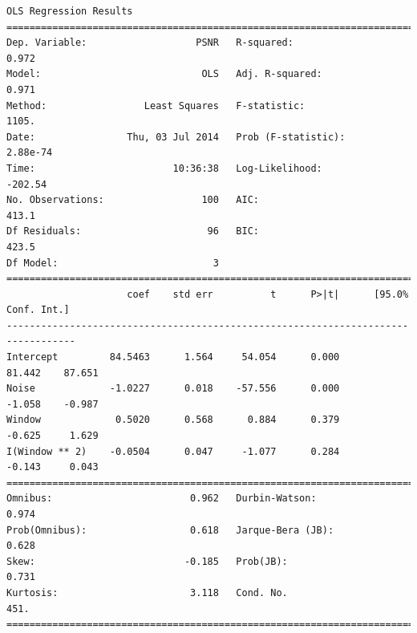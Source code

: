 \documentclass[11pt]{article}
\theoremstyle{definition}
\begin{document}
{\footnotesize
\begin{lstlisting}[caption = Time Series 1 - Box Filter OLS Model, label = {boxfilterseries1}]
                            OLS Regression Results                            
==============================================================================
Dep. Variable:                   PSNR   R-squared:                       0.972
Model:                            OLS   Adj. R-squared:                  0.971
Method:                 Least Squares   F-statistic:                     1105.
Date:                Thu, 03 Jul 2014   Prob (F-statistic):           2.88e-74
Time:                        10:36:38   Log-Likelihood:                -202.54
No. Observations:                 100   AIC:                             413.1
Df Residuals:                      96   BIC:                             423.5
Df Model:                           3                                         
==================================================================================
                     coef    std err          t      P>|t|      [95.0% Conf. Int.]
----------------------------------------------------------------------------------
Intercept         84.5463      1.564     54.054      0.000        81.442    87.651
Noise             -1.0227      0.018    -57.556      0.000        -1.058    -0.987
Window             0.5020      0.568      0.884      0.379        -0.625     1.629
I(Window ** 2)    -0.0504      0.047     -1.077      0.284        -0.143     0.043
==============================================================================
Omnibus:                        0.962   Durbin-Watson:                   0.974
Prob(Omnibus):                  0.618   Jarque-Bera (JB):                0.628
Skew:                          -0.185   Prob(JB):                        0.731
Kurtosis:                       3.118   Cond. No.                         451.
==============================================================================
\end{lstlisting}

}
\end{document}

